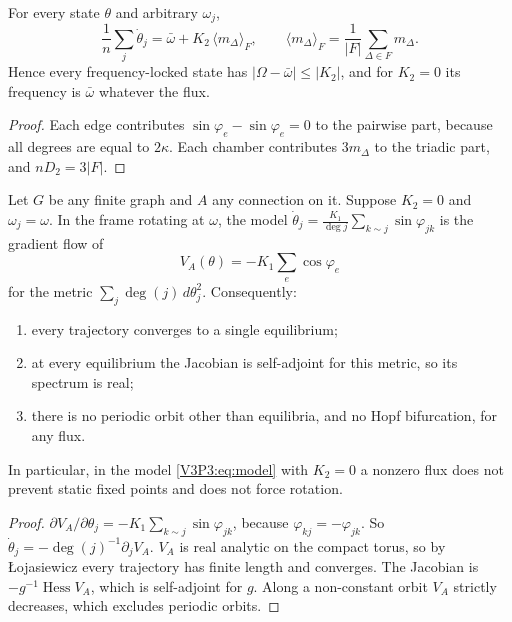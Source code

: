 \begin{proposition}\label{V3P3:prop:sum}
For every state $\theta$ and arbitrary $\omega_j$,
\[
\frac1n\sum_j\dot\theta_j=\bar\omega+K_2\,\langle m_\Delta\rangle_F,\qquad
\langle m_\Delta\rangle_F=\frac1{|F|}\sum_{\Delta\in F}m_\Delta .
\]
Hence every frequency-locked state has $|\Omega-\bar\omega|\le|K_2|$, and for $K_2=0$ its
frequency is $\bar\omega$ whatever the flux.
\end{proposition}

\begin{proof}
Each edge contributes $\sin\varphi_e-\sin\varphi_e=0$ to the pairwise part, because all
degrees are equal to $2\kappa$. Each chamber contributes $3m_\Delta$ to the triadic part, and
$nD_2=3|F|$.
\end{proof}

\begin{theorem}\label{V3P3:thm:gradient}
Let $G$ be any finite graph and $A$ any connection on it. Suppose $K_2=0$ and
$\omega_j=\omega$. In the frame rotating at $\omega$, the model
$\dot\theta_j=\frac{K_1}{\deg j}\sum_{k\sim j}\sin\varphi_{jk}$ is the gradient flow of
\[
V_A(\theta)=-K_1\sum_{e}\cos\varphi_e
\]
for the metric $\sum_j\deg(j)\,d\theta_j^{2}$. Consequently:
\begin{enumerate}
\item[(i)] every trajectory converges to a single equilibrium;
\item[(ii)] at every equilibrium the Jacobian is self-adjoint for this metric, so its spectrum
is real;
\item[(iii)] there is no periodic orbit other than equilibria, and no Hopf bifurcation, for any
flux.
\end{enumerate}
In particular, in the model \eqref{V3P3:eq:model} with $K_2=0$ a nonzero flux does not
prevent static fixed points and does not force rotation.
\end{theorem}

\begin{proof}
$\partial V_A/\partial\theta_j=-K_1\sum_{k\sim j}\sin\varphi_{jk}$, because
$\varphi_{kj}=-\varphi_{jk}$. So $\dot\theta_j=-\deg(j)^{-1}\partial_jV_A$. $V_A$ is real
analytic on the compact torus, so by \L{}ojasiewicz \cite{Loj63} every trajectory has finite
length and converges. The Jacobian is $-g^{-1}\operatorname{Hess}V_A$, which is self-adjoint
for $g$. Along a non-constant orbit $V_A$ strictly decreases, which excludes periodic orbits.
\end{proof}

